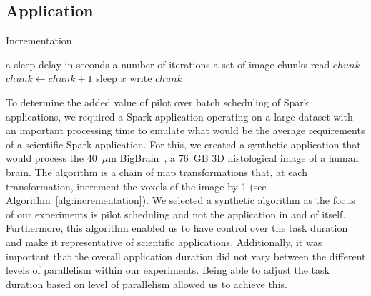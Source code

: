 \documentclass{IEEEtran}
\newcommand{\Desc}[2]{\State \makebox[2em][l]{#1}#2}
\begin{document}
    \subsection{Application}
        \begin{algorithm}\caption{Incrementation}\label{alg:incrementation}              
            \begin{algorithmic}[1]                                                       
                \Input                                                                       
                    \Desc{$x$}{a sleep delay in seconds}                                         
                    \Desc{$n$}{a number of iterations}                                           
                    \Desc{$C$}{a set of image chunks}                                            
                \EndInput                                                                    
                    \State read $chunk$                                        
                        \State $chunk\gets chunk+1$                                              
                        \State sleep $x$                               
                    \EndFor                                                                      
                    \State write $chunk$                                            
                \EndFor                                                                      
            \end{algorithmic}                                                                
        \end{algorithm}
    To determine the added value of pilot over batch scheduling of Spark
    applications, we required a Spark application operating on a large dataset with
    an important processing time to emulate what would be the average requirements
    of a scientific Spark application. For this, we created a synthetic application 
    that would process the 40~$\mu$m BigBrain~\cite{amunts2013bigbrain}, a 76~GB 3D histological
    image of a human brain. The algorithm is a chain of map transformations that,
    at each transformation, increment the voxels of the image by 1 (see Algorithm~\ref{alg:incrementation}).
    We selected a synthetic algorithm
    as the focus of our experiments is pilot scheduling and not the application in
    and of itself. Furthermore, this algorithm enabled us to have control over the task duration and make it representative of scientific applications. Additionally, it was important
    that the overall application duration did not vary between the different levels of
    parallelism within our experiments. Being able to adjust the task duration based on
    level of parallelism allowed us to achieve this.
\end{document}
